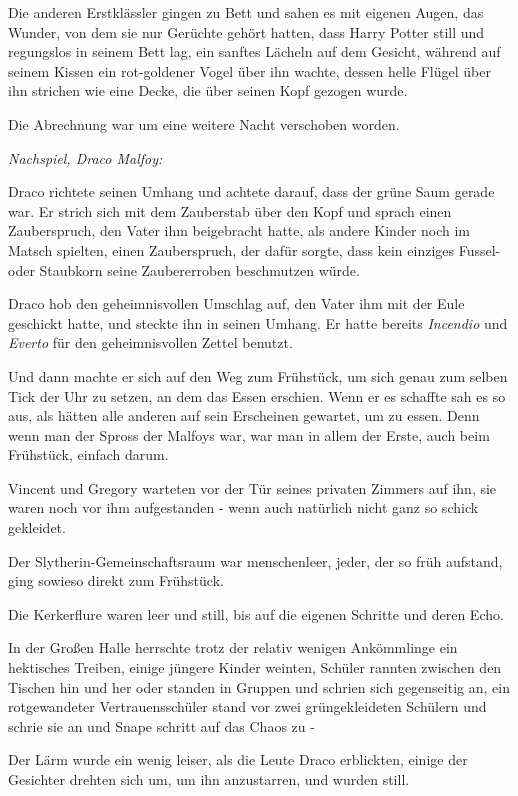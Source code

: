 {Die anderen Erstklässler gingen zu Bett und sahen es mit eigenen Augen, das Wunder, von dem sie nur Gerüchte gehört hatten, dass Harry Potter still und regungslos in seinem Bett lag, ein sanftes Lächeln auf dem Gesicht, während auf seinem Kissen ein rot-goldener Vogel über ihn wachte, dessen helle Flügel über ihn strichen wie eine Decke, die über seinen Kopf gezogen wurde.

Die Abrechnung war um eine weitere Nacht verschoben worden.

\emph{Nachspiel, Draco Malfoy:}

Draco richtete seinen Umhang und achtete darauf, dass der grüne Saum gerade war. Er strich sich mit dem Zauberstab über den Kopf und sprach einen Zauberspruch, den Vater ihm beigebracht hatte, als andere Kinder noch im Matsch spielten, einen Zauberspruch, der dafür sorgte, dass kein einziges Fussel- oder Staubkorn seine Zaubererroben beschmutzen würde.

Draco hob den geheimnisvollen Umschlag auf, den Vater ihm mit der Eule geschickt hatte, und steckte ihn in seinen Umhang. Er hatte bereits \emph{Incendio} und \emph{Everto} für den geheimnisvollen Zettel benutzt.

Und dann machte er sich auf den Weg zum Frühstück, um sich genau zum selben Tick der Uhr zu setzen, an dem das Essen erschien. Wenn er es schaffte sah es so aus, als hätten alle anderen auf sein Erscheinen gewartet, um zu essen. Denn wenn man der Spross der Malfoys war, war man in allem der Erste, auch beim Frühstück, einfach darum.

Vincent und Gregory warteten vor der Tür seines privaten Zimmers auf ihn, sie waren noch vor ihm aufgestanden - wenn auch natürlich nicht ganz so schick gekleidet.

Der Slytherin-Gemeinschaftsraum war menschenleer, jeder, der so früh aufstand, ging sowieso direkt zum Frühstück.

Die Kerkerflure waren leer und still, bis auf die eigenen Schritte und deren Echo.

In der Großen Halle herrschte trotz der relativ wenigen Ankömmlinge ein hektisches Treiben, einige jüngere Kinder weinten, Schüler rannten zwischen den Tischen hin und her oder standen in Gruppen und schrien sich gegenseitig an, ein rotgewandeter Vertrauensschüler stand vor zwei grüngekleideten Schülern und schrie sie an und Snape schritt auf das Chaos zu -

Der Lärm wurde ein wenig leiser, als die Leute Draco erblickten, einige der Gesichter drehten sich um, um ihn anzustarren, und wurden still.

}
